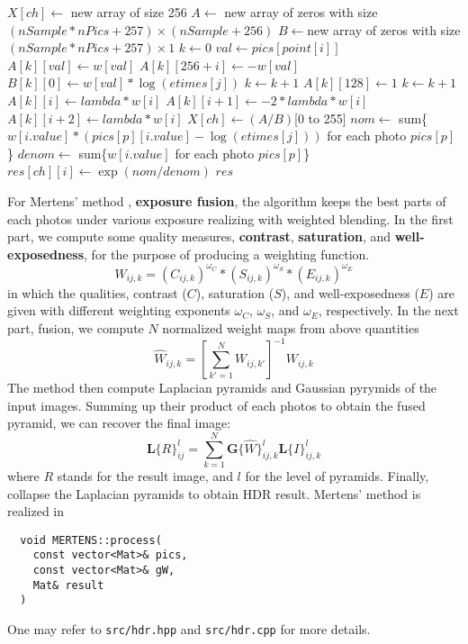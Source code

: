 \begin{algorithm}
\begin{algorithmic}[1]
    \State $X[ch]\gets$ new array of size 256
    \State $A\gets$ new array of zeros with size $(nSample*nPics+257)\times(nSample+256)$
    \State $B\gets$new array of zeros with size $(nSample*nPics+257)\times 1$
    \State $k\gets 0$
        \State $val\gets pics[point[i]]$
        \State $A[k][val]\gets w[val]$
        \State $A[k][256+i]\gets-w[val]$
        \State $B[k][0]\gets w[val]*\log(etimes[j])$
        \State $k\gets k+1$
      \EndFor
    \EndFor
    \State $A[k][128]\gets 1$
      \State $k\gets k+1$
      \State $A[k][i]\gets lambda*w[i]$
      \State $A[k][i+1]\gets -2*lambda*w[i]$
      \State $A[k][i+2]\gets lambda*w[i]$
    \EndFor
    \State $X[ch]\gets (A/B)$[0 to 255]
  \EndFor	
      \State $nom\gets$ sum\{$w[i.value]*(pics[p][i.value]-\log(etimes[j]))$ for each photo $pics[p]$\}
      \State $denom\gets$ sum\{$w[i.value]$ for each photo $pics[p]$\}
      \State $res[ch][i]\gets\exp(nom/denom)$
    \EndFor
  \EndFor
  \State\Return $res$
\EndFunction
\end{algorithmic}
\end{algorithm}

\newpage 
For Mertens' method \cite{ref:mertens}, \textbf{exposure fusion}, the algorithm keeps the best parts of each photos under various exposure realizing with weighted blending. In the first part, we compute some quality measures, \textbf{contrast}, \textbf{saturation}, and \textbf{well-exposedness}, for the purpose of producing a weighting function.
$$ W_{ij,k}=(C_{ij,k})^{\omega_C}*(S_{ij,k})^{\omega_S}*(E_{ij,k})^{\omega_E} $$
in which the qualities, contrast ($C$), saturation ($S$), and well-exposedness ($E$) are given with different weighting exponents $\omega_C$, $\omega_S$, and $\omega_E$, respectively. 
In the next part, fusion, we compute $N$ normalized weight maps from above quantities
$$\hat{W}_{ij,k}= \left[ \sum_{k'=1}^N W_{ij,k'} \right]^{-1}{W}_{ij,k}$$
The method then compute Laplacian pyramids and Gaussian pyrymids of the input images. Summing up their product of each photos to obtain the fused pyramid, we can recover the final image:
$$ \textbf{L}\{R\}^l_{ij}=\sum_{k=1}^N\textbf{G}\{\hat{W}\}^l_{ij,k}\textbf{L}\{I\}^l_{ij,k} $$
where $R$ stands for the result image, and $l$ for the level of pyramids. Finally, collapse the Laplacian pyramids to obtain HDR result. Mertens' method is realized in 
\begin{lstlisting}
  void MERTENS::process(
    const vector<Mat>& pics,
    const vector<Mat>& gW, 
    Mat& result
  )
\end{lstlisting}
One may refer to \texttt{src/hdr.hpp} and \texttt{src/hdr.cpp} for more details.

